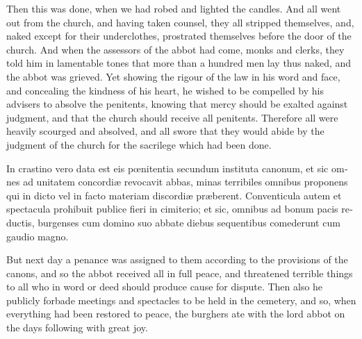 \documentclass[10pt]{book}
\begin{document}
\begin{paracol}{2}
\switchcolumn

Then this was done, when we had robed and lighted the candles. And all went out from the church, and having taken counsel, they all stripped themselves, and, naked except for their underclothes, prostrated themselves before the door of the church. And when the assessors of the abbot had come, monks and clerks, they told him in lamentable tones that more than a hundred men lay thus naked, and the abbot was grieved. Yet showing the rigour of the law in his word and face, and concealing the kindness of his heart, he wished to be compelled by his advisers to absolve the penitents, knowing that mercy should be exalted against judgment, and that the church should receive all penitents. Therefore all were heavily scourged and absolved, and all swore that they would abide by the judgment of the church for the sacrilege which had been done.

\switchcolumn*

\begin{otherlanguage}{latin}
In crastino vero data est eis p\oe{}nitentia secundum instituta canonum, et sic omnes ad unitatem concordi\ae{} revocavit abbas, minas terribiles omnibus proponens qui in dicto vel in facto materiam discordi\ae{} pr\ae{}berent. Conventicula autem et spectacula prohibuit  publice fieri in cimiterio; et sic, omnibus ad bonum pacis reductis, burgenses cum domino suo abbate diebus sequentibus comederunt cum gaudio magno.
\end{otherlanguage}

\switchcolumn

But next day a penance was assigned to them according to the provisions of the canons, and so the abbot received all in full peace, and threatened terrible things to all who in word or deed should produce cause for dispute. Then also he publicly forbade meetings and spectacles to be held in the cemetery, and so, when everything had been restored to peace, the burghers ate with the lord abbot on the days following with great joy.

\switchcolumn*


\end{paracol}
\end{document}

